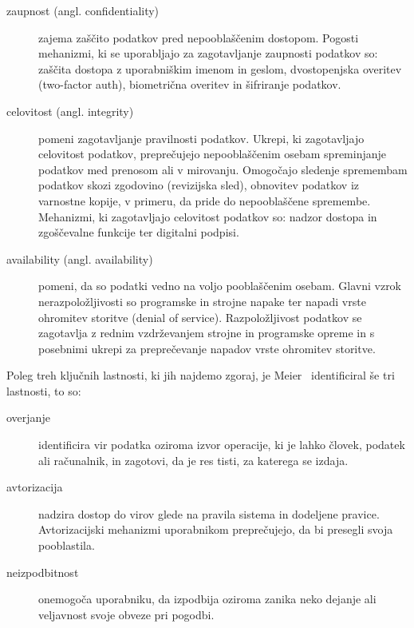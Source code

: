 \documentclass[12pt,a4paper,openany,tikz]{book}
\theoremstyle{plain}
\theoremstyle{definition}
\begin{document}
\begin{description}
\item[\Gls{zaupnost} (angl. confidentiality)] zajema zaščito podatkov pred nepooblaščenim dostopom. Pogosti mehanizmi, ki se uporabljajo za zagotavljanje zaupnosti podatkov so: zaščita dostopa z uporabniškim imenom in geslom, dvostopenjska overitev (two-factor auth), biometrična overitev in šifriranje podatkov.

\item[\Gls{celovitost} (angl. integrity)] pomeni zagotavljanje pravilnosti podatkov. Ukrepi, ki zagotavljajo celovitost podatkov, preprečujejo nepooblaščenim osebam spreminjanje podatkov med prenosom ali v mirovanju. Omogočajo sledenje spremembam podatkov skozi zgodovino (revizijska sled), obnovitev podatkov iz varnostne kopije, v primeru, da pride do nepooblaščene spremembe. Mehanizmi, ki zagotavljajo celovitost podatkov so: nadzor dostopa in zgoščevalne funkcije ter digitalni podpisi.

\item[\Gls{availability} (angl. availability)] pomeni, da so podatki vedno na voljo pooblaščenim osebam. Glavni vzrok nerazpoložljivosti so programske in strojne napake ter napadi vrste ohromitev storitve (denial of service). Razpoložljivost podatkov se zagotavlja z rednim vzdrževanjem strojne in programske opreme in s posebnimi ukrepi za preprečevanje napadov vrste ohromitev storitve.

\end{description}

\noindent
Poleg treh ključnih lastnosti, ki jih najdemo zgoraj, je Meier~\cite{meier2003improving} identificiral še tri lastnosti, to so:

\begin{description}

\item[\Gls{overjanje}] identificira vir podatka oziroma izvor operacije, ki je lahko človek, podatek ali računalnik, in zagotovi, da je res tisti, za katerega se izdaja.

\item[\Gls{avtorizacija}] nadzira dostop do virov glede na pravila sistema in dodeljene pravice. Avtorizacijski mehanizmi uporabnikom preprečujejo, da bi presegli svoja pooblastila.

\item[\Gls{neizpodbitnost}] onemogoča uporabniku, da izpodbija oziroma zanika neko dejanje ali veljavnost svoje obveze pri pogodbi.

\end{description}
\end{document}
